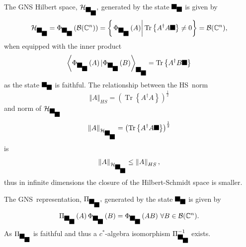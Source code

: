 \documentclass[aps,preprint]{revtex4}%
\providecommand{\U}[1]{\protect\rule{.1in}{.1in}}
\begin{document}
The GNS Hilbert space, $\mathcal{H}_{\U{3c9} _{\U{3c1} }},$ generated by the
state $\U{3c9} _{\U{3c1} }$ is given by
\begin{equation}
\mathcal{H}_{\U{3c9} _{\U{3c1} }}=\Phi_{\U{3c9} _{\U{3c1} }}\left(
\mathcal{B}(\mathbb{C}^{n})\right)  =\left\{  \left.  \Phi_{\U{3c9} _{\U{3c1}
}}\left(  A\right)  \right\vert \operatorname{Tr}\left\{  A^{\dagger}A\U{3c1}
\right\}  \neq0\right\}  =\mathcal{B}(\mathbb{C}^{n}),
\end{equation}
when equipped with the inner product
\begin{equation}
\left\langle \Phi_{\U{3c9} _{\U{3c1} }}\left(  A\right)  |\Phi_{\U{3c9}
_{\U{3c1} }}\left(  B\right)  \right\rangle _{\U{3c9} _{\U{3c1} }%
}=\operatorname{Tr}\left\{  A^{\dagger}B\U{3c1} \right\}
\end{equation}
as the state $\U{3c9} _{\U{3c1} }$ is faithful. The relationship between the
HS\ norm
\begin{equation}
\left\Vert A\right\Vert _{HS}=\left(  \operatorname{Tr}\left\{  A^{\dagger
}A\right\}  \right)  ^{\frac{1}{2}}%
\end{equation}
and norm of $\mathcal{H}_{\U{3c9} _{\U{3c1} }}$
\begin{equation}
\left\Vert A\right\Vert _{\mathcal{H}_{\U{3c9} _{\U{3c1} }}}=\left(
\operatorname{Tr}\left\{  A^{\dagger}A\U{3c1} \right\}  \right)  ^{\frac{1}%
{2}}%
\end{equation}
is
\begin{equation}
\left\Vert A\right\Vert _{\mathcal{H}_{\U{3c9} _{\U{3c1} }}}\leq\left\Vert
A\right\Vert _{HS},
\end{equation}
thus in infinite dimensions the closure of the Hilbert-Schmidt space is smaller.

The GNS\ representation, $\Pi_{\U{3c9} _{\U{3c1} }},$ generated by the state
$\U{3c9} _{\U{3c1} }$ is given by
\begin{equation}
\Pi_{\U{3c9} _{\U{3c1} }}\left(  A\right)  \Phi_{\U{3c9} _{\U{3c1} }}\left(
B\right)  =\Phi_{\U{3c9} _{\U{3c1} }}\left(  AB\right)  \,\forall
B\in\mathcal{B}(\mathbb{C}^{n}).
\end{equation}
As $\Pi_{\U{3c9} _{\U{3c1} }}$ is faithful and thus a $c^{\ast}$-algebra
isomorphism $\Pi_{\U{3c9} _{\U{3c1} }}^{-1}$ exists.
\end{document}
